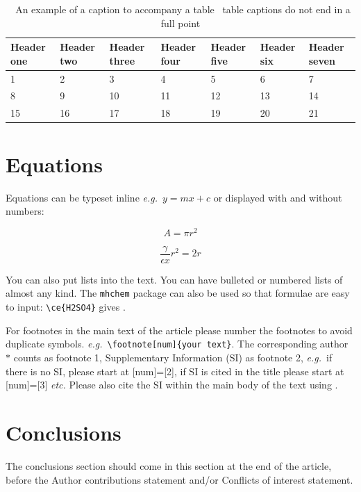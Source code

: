 \documentclass[twoside,twocolumn,9pt]{article}
\begin{document}
\begin{table}
\small
  \caption{\ An example of a caption to accompany a table \textendash\ table captions do not end in a full point}
  \label{tbl:example2}
  \begin{tabular*}{\textwidth}{@{\extracolsep{\fill}}lllllll}
    \hline
    Header one & Header two & Header three & Header four & Header five & Header six  & Header seven\\
    \hline
    1 & 2 & 3 & 4 & 5 & 6  & 7\\
    8 & 9 & 10 & 11 & 12 & 13 & 14 \\
    15 & 16 & 17 & 18 & 19 & 20 & 21\\
    \hline
  \end{tabular*}
\end{table}

\section{Equations}

Equations can be typeset inline \textit{e.g.}\ $ y = mx + c$ or displayed with and without numbers:

 \[ A = \pi r^2 \]

\begin{equation}
  \frac{\gamma}{\epsilon x} r^2 = 2r
\end{equation}

You can also put lists into the text. You can have bulleted or numbered lists of almost any kind. 
The \texttt{mhchem} package can also be used so that formulae are easy to input: \texttt{\textbackslash ce\{H2SO4\}} gives . 

For footnotes in the main text of the article please number the footnotes to avoid duplicate symbols. \textit{e.g.}\ \texttt{\textbackslash footnote[num]\{your text\}}. The corresponding author $\ast$ counts as footnote 1, Supplementary Information (SI) as footnote 2, \textit{e.g.}\ if there is no SI, please start at [num]=[2], if SI is cited in the title please start at [num]=[3] \textit{etc.} Please also cite the SI within the main body of the text using \dag.

\section*{Conclusions}
The conclusions section should come in this section at the end of the article, before the Author contributions statement and/or Conflicts of interest statement.
\end{document}
